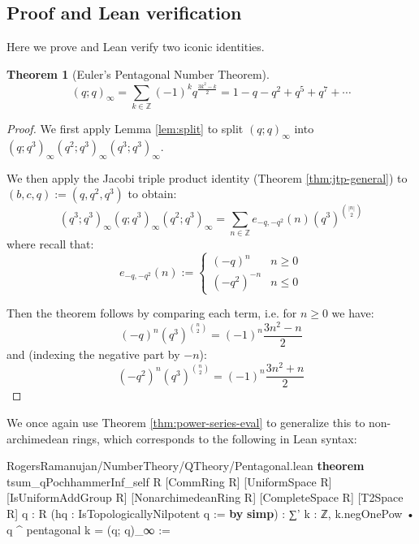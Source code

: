 \documentclass[12pt]{amsart}
\newtheorem{theorem}{Theorem}[subsection]
\theoremstyle{definition}
\theoremstyle{remark}
\numberwithin{equation}{subsection}
\newcommand{\Z}{\mathbb Z}
\newcommand{\kw}[1]{\textcolor{keywordcolor}{\textbf{#1}}}
\newcommand{\var}[1]{\textcolor{tacticcolor}{#1}}
\newcommand{\prop}[1]{\textcolor{sortcolor}{#1}}
\newcommand{\imp}[1]{\textcolor{commentcolor}{\textbraceleft#1\textbraceright}}
\begin{document}
\subsection{Proof and Lean verification}
Here we prove and Lean verify two iconic identities.

\begin{theorem}[Euler's Pentagonal Number Theorem]
\label{thm:PNT}
\begin{equation}(q; q)_\infty = \sum_{k \in \Z} (-1)^k q^{\frac{3k^2-k}{2}} = 1 - q - q^2 + q^5 + q^7 + \cdots\end{equation}
\end{theorem}
\begin{proof}
We first apply Lemma \ref{lem:split} to split $(q; q)_\infty$ into $(q; q^3)_\infty (q^2; q^3)_\infty (q^3; q^3)_\infty$.

We then apply the Jacobi triple product identity (Theorem \ref{thm:jtp-general}) to $(b, c, q) := (q, q^2, q^3)$ to obtain:
\begin{equation}(q^3;q^3)_\infty (q;q^3)_\infty (q^2;q^3)_\infty = \sum_{n \in \Z} e_{-q,-q^2}(n) (q^3)^{\binom{|n|}{2}}\end{equation}
where recall that:
\begin{equation}e_{-q,-q^2}(n) :=
\begin{cases}
(-q)^n & n \ge 0 \\
(-q^2)^{-n} & n \le 0
\end{cases}\end{equation}

Then the theorem follows by comparing each term, i.e. for $n \ge 0$ we have:
\begin{equation}(-q)^n (q^3)^{\binom{n}{2}} = (-1)^n \frac{3n^2-n}{2}\end{equation}
and (indexing the negative part by $-n$):
\begin{equation}(-q^2)^n (q^3)^{\binom{n}{2}} = (-1)^n \frac{3n^2+n}{2}\end{equation}
\end{proof}

We once again use Theorem \ref{thm:power-series-eval} to generalize this to non-archimedean rings, which corresponds to the following in Lean syntax:

\begin{code}{RogersRamanujan/NumberTheory/QTheory/Pentagonal.lean}
\kw{theorem} tsum_qPochhammerInf_self \imp{R} [CommRing \var{R}] [UniformSpace \var{R}]
  [IsUniformAddGroup \var{R}] [NonarchimedeanRing \var{R}] [CompleteSpace \var{R}] [T2Space \var{R}]
  \imp{q : R} (\var{hq} : IsTopologicallyNilpotent \var{q} := \kw{by} \kw{simp}) :
  ∑' \var{k} : ℤ, \var{k}.\prop{negOnePow} • \var{q} ^ pentagonal \var{k} = (\var{q}; \var{q})_∞ :=
\end{code}
\end{document}
